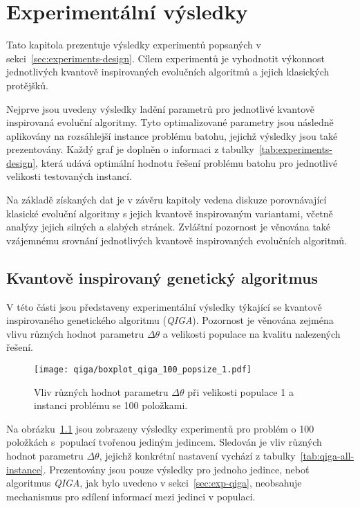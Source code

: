 \chapter{Experimentální výsledky} \label{chapt:experiments}
Tato kapitola prezentuje výsledky experimentů popsaných v sekci~\ref{sec:experiments-design}. 
Cílem experimentů je vyhodnotit výkonnost jednotlivých kvantově inspirovaných evolučních algoritmů a jejich klasických protějšků. 

Nejprve jsou uvedeny výsledky ladění parametrů pro jednotlivé kvantově inspirovaná evoluční algoritmy. 
Tyto optimalizované parametry jsou následně aplikovány na rozsáhlejší instance problému batohu, jejichž výsledky jsou také prezentovány. 
Každý graf je doplněn o informaci z tabulky~\ref{tab:experiments-design}, která udává optimální hodnotu řešení problému batohu pro jednotlivé velikosti testovaných instancí.

Na základě získaných dat je v závěru kapitoly vedena diskuze porovnávající klasické evoluční algoritmy s jejich kvantově inspirovaným variantami, včetně analýzy jejich silných a slabých stránek. 
Zvláštní pozornost je věnována také vzájemnému srovnání jednotlivých kvantově inspirovaných evolučních algoritmů.

\section{Kvantově inspirovaný genetický algoritmus}\label{sec:exp-qisa}
V této části jsou představeny experimentální výsledky týkající se kvantově inspirovaného genetického algoritmu (\emph{QIGA}). 
Pozornost je věnována zejména vlivu různých hodnot parametru $\Delta\theta$ a velikosti populace na kvalitu nalezených řešení. 

\begin{figure}[ht!]
    \centering
    \texttt{[image: qiga/boxplot\_qiga\_100\_popsize\_1.pdf]}
    \caption{Vliv různých hodnot parametru $\Delta\theta$ při velikosti populace 1 a instanci problému se 100 položkami.}
    \label{fig:qiga-pop1}
\end{figure}

Na obrázku~\ref{fig:qiga-pop1} jsou zobrazeny výsledky experimentů pro problém o 100 položkách s~populací tvořenou jediným jedincem.
Sledován je vliv různých hodnot parametru $\Delta\theta$, jejichž konkrétní nastavení vychází z tabulky~\ref{tab:qiga-all-instance}. 
Prezentovány jsou pouze výsledky pro jednoho jedince, neboť algoritmus \emph{QIGA}, jak bylo uvedeno v sekci~\ref{sec:exp-qiga}, neobsahuje mechanismus pro sdílení informací mezi jedinci v populaci. 


